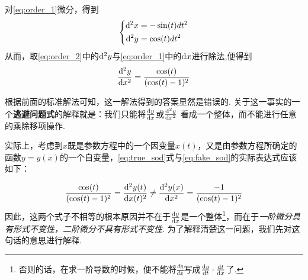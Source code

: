 	\begin{solution}
	 对\eqref{eq:order_1}微分，得到
	 	\begin{equation}
		\label{eq:order_2}
		 	\left\{
				\begin{aligned}
				\mathrm{d}^2 x & = -\sin(t) dt^2 \\
				\mathrm{d}^2 y & = \cos(t) dt^2 \\
				\end{aligned}
			\right.
		\end{equation}
	从而，取\eqref{eq:order_2}中的$\mathrm{d}^2 y$与\eqref{eq:order_1}中的$\mathrm{d} x$进行除法,便得到
		\begin{equation}
			\label{eq:fake_sod}
			\frac{\mathrm{d}^2y}{\mathrm{d} x ^2} = \frac{\cos(t)}{(\cos(t)-1)^2}
		\end{equation}
	\end{solution}

	根据前面的标准解法可知，这一解法得到的答案显然是错误的. 关于这一事实的一个\textbf{逃避问题式}的解释就是：我们只能将$\frac{\mathrm{d} y}{\mathrm{d} x}$或$\frac{\mathrm{d}^2y}{\mathrm{d} x ^2}$ 看成一个整体，而不能进行任意的乘除移项操作.\par

	实际上，考虑到$x$既是参数方程中的一个因变量$x(t)$，又是由参数方程所确定的函数$y=y(x)$的一个自变量，\eqref{eq:true_sod}式与\eqref{eq:fake_sod}的实际表达式应该如下：

	$$\frac{\cos(t)}{(\cos(t)-1)^2} = \frac{\mathrm{d}^2 y(t)}{\mathrm{d} x(t)^2} \neq \frac{\mathrm{d}^2 y(x)}{\mathrm{d} x^2}= \frac{-1}{(\cos(t)-1)^2}$$
	因此，这两个式子不相等的根本原因并不在于$\frac{\mathrm{d} y}{\mathrm{d} x}$是一个整体\footnote{否则的话，在求一阶导数的时候，便不能将$\frac{dy}{dx}$写成$\frac{\mathrm{d} y}{\mathrm{d} t}\cdot\frac{\mathrm{d} t}{\mathrm{d} x}$了.}，而在于\emph{一阶微分具有形式不变性，二阶微分不具有形式不变性}. 为了解释清楚这一问题，我们先对这句话的意思进行解释.\par


